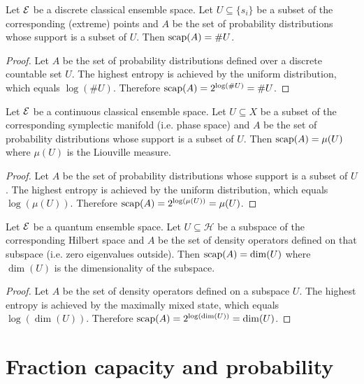 \begin{mathSection}
\begin{prop}
	Let $\mathcal{E}$ be a discrete classical ensemble space. Let $U \subseteq \{s_i\}$ be a subset of the corresponding (extreme) points and $A$ be the set of probability distributions whose support is a subset of $U$. Then $\mathrm{scap}(A) = \#U$.
\end{prop}

\begin{proof}
	Let $A$ be the set of probability distributions defined over a discrete countable set $U$. The highest entropy is achieved by the uniform distribution, which equals $\log (\#U)$. Therefore $\mathrm{scap}(A) = 2^{\log(\#U)} = \#U$.
\end{proof}

\begin{prop}
	Let $\mathcal{E}$ be a continuous classical ensemble space. Let $U \subseteq X$ be a subset of the corresponding symplectic manifold (i.e. phase space) and $A$ be the set of probability distributions whose support is a subset of $U$. Then $\mathrm{scap}(A) = \mu(U)$ where $\mu(U)$ is the Liouville measure.
\end{prop}

\begin{proof}
	Let $A$ be the set of probability distributions whose support is a subset of $U$. The highest entropy is achieved by the uniform distribution, which equals $\log(\mu(U))$. Therefore $\mathrm{scap}(A) = 2^{\log(\mu(U))} = \mu(U)$.
\end{proof}

\begin{prop}
	Let $\mathcal{E}$ be a quantum ensemble space. Let $U \subseteq \mathcal{H}$ be a subspace of the corresponding Hilbert space and $A$ be the set of density operators defined on that subspace (i.e. zero eigenvalues outside). Then $\mathrm{scap}(A) = \dim(U)$ where $\dim(U)$ is the dimensionality of the subspace.
\end{prop}

\begin{proof}
	Let $A$ be the set of density operators defined on a subspace $U$. The highest entropy is achieved by the maximally mixed state, which equals $\log(\dim(U))$. Therefore $\mathrm{scap}(A) = 2^{\log(\dim(U))} = \dim(U)$.
\end{proof}
\end{mathSection}

\section{Fraction capacity and probability}

